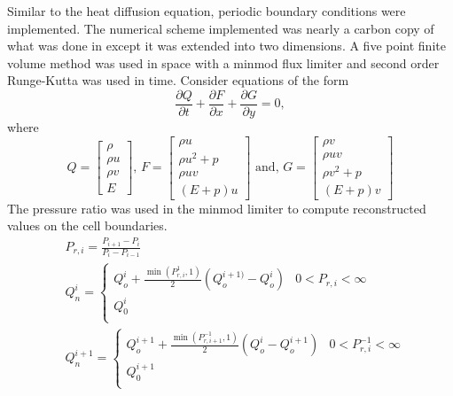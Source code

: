 \documentclass[preprints,article,accept,moreauthors,pdftex]{Definitions/mdpi}
\begin{document}
Similar to the heat diffusion equation, periodic boundary conditions were implemented. The numerical scheme implemented was nearly a carbon copy of what was done in \cite{Magee2018AcceleratingDecomposition} except it was extended into two dimensions. A five point finite volume method was used in space with a minmod flux limiter and second order Runge-Kutta was used in time. Consider equations of the form
\begin{equation*}
    \frac{\partial Q}{\partial t}+\frac{\partial F}{\partial x}+\frac{\partial G}{\partial y} = 0,
\end{equation*}
where
\begin{equation*}
    Q = \begin{bmatrix}
        \rho\\
        \rho u\\
        \rho v\\
        E
        \end{bmatrix}
        \text{, }
    F = \begin{bmatrix}
    \rho u\\
    \rho u^2+p\\
    \rho u v\\
    (E+p)u
    \end{bmatrix}
    \text{ and, }
    G = \begin{bmatrix}
    \rho v\\
    \rho u v\\
    \rho v^2+p\\
    (E+p)v
    \end{bmatrix}
\end{equation*}
The pressure ratio was used in the minmod limiter to compute reconstructed values on the cell boundaries.
\begin{align*}
   & P_{r,i} = \frac{P_{i+1}-P_{i}}{P_{i}-P_{i-1}}\\
    &Q_n^{i} = \begin{cases} 
      Q_o^{i}+\frac{\min(P_{r,i}^1,1)}{2}(Q_o^{i+1)}-Q_o^{i}) & 0 < P_{r,i} < \infty \\
      Q_0^{i} \\
   \end{cases}\\
    &Q_n^{i+1} = \begin{cases} 
      Q_o^{i+1}+\frac{\min(P_{r,i+1}^{-1},1)}{2}(Q_o^{i}-Q_o^{i+1}) & 0 < P_{r,i}^{-1} < \infty \\
      Q_0^{i+1} \\
   \end{cases}
\end{align*}
\end{document}
